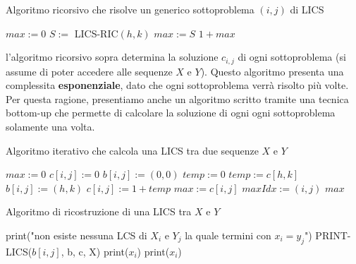 \documentclass[12pt]{article}
\begin{document}
\begin{algorithm}[H]
    \caption{Algoritmo ricorsivo che risolve un generico sottoproblema $(i,j)$ di LICS}
    \DontPrintSemicolon
     {
         {
        } {
            $max := 0$
             {
                 {
                     {
                        $S := $ LICS-RIC$(h,k)$ \;
                         {
                            $max := S$ \;
                        }
                    }
                }
            }
        }
        \Return $1 + max$
    }
\end{algorithm} \noindent
l'algoritmo ricorsivo sopra determina la soluzione $c_{i,j}$
di ogni sottoproblema (si assume di poter accedere alle sequenze $X$ e $Y$).
Questo algoritmo presenta una complessita \textbf{esponenziale}, dato che ogni sottoproblema verrà risolto più volte. Per questa ragione, presentiamo anche un algoritmo scritto
tramite una tecnica bottom-up che permette di calcolare la soluzione di ogni ogni sottoproblema solamente una volta. \newline
\begin{algorithm}[H]
    \caption{Algoritmo iterativo che calcola una LICS tra due sequenze $X$ e $Y$}
    \DontPrintSemicolon
     {
        $max := 0$ \;
         {
             {
                 {
                    $c[i,j] := 0$ \;
                    $b[i,j] := (0,0)$ \;
                } {
                    $temp := 0$ \;
                     {
                         {
                             {
                                $temp := c[h,k]$ \;
                                $b[i,j] := (h,k)$ \;
                            }
                        }
                    }
                    $c[i,j] := 1 + temp$
                }
                 {
                    $max := c[i,j]$ \;
                    $maxIdx := (i,j)$
                }
            }
        }
        \Return $max$
    }
\end{algorithm} \noindent
\begin{algorithm}[H]
    \caption{Algoritmo di ricostruzione di una LICS tra $X$ e $Y$}
    \DontPrintSemicolon
     {
         {
            print("non esiste nessuna LCS di $X_i$ e $Y_j$ la quale termini con $x_i = y_j$")
        } {
             {
                PRINT-LICS($b[i,j]$, b, c, X) \;
                print($x_i$)
            } {
                print($x_i$)
            }
        }
    }
\end{algorithm}
\end{document}
